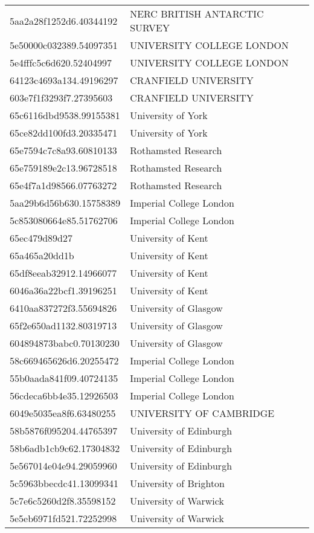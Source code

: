 \begin{tabular}{ll}
5aa2a28f1252d6.40344192 & NERC BRITISH ANTARCTIC SURVEY \\
5e50000c032389.54097351 & UNIVERSITY COLLEGE LONDON \\
5e4fffc5c6d620.52404997 & UNIVERSITY COLLEGE LONDON \\
64123c4693a134.49196297 & CRANFIELD UNIVERSITY \\
603e7f1f3293f7.27395603 & CRANFIELD UNIVERSITY \\
65c6116dbd9538.99155381 & University of York \\
65ce82dd100fd3.20335471 & University of York \\
65e7594c7c8a93.60810133 & Rothamsted Research \\
65e759189e2c13.96728518 & Rothamsted Research \\
65e4f7a1d98566.07763272 & Rothamsted Research \\
5aa29b6d56b630.15758389 & Imperial College London \\
5c853080664e85.51762706 & Imperial College London \\
65ec479d89d27 & University of Kent \\
65a465a20dd1b & University of Kent \\
65df8eeab32912.14966077 & University of Kent \\
6046a36a22bcf1.39196251 & University of Kent \\
6410aa837272f3.55694826 & University of Glasgow \\
65f2e650ad1132.80319713 & University of Glasgow \\
604894873babc0.70130230 & University of Glasgow \\
58c669465626d6.20255472 & Imperial College London \\
55b0aada841f09.40724135 & Imperial College London \\
56cdeca6bb4e35.12926503 & Imperial College London \\
6049e5035ea8f6.63480255 & UNIVERSITY OF CAMBRIDGE \\
58b5876f095204.44765397 & University of Edinburgh \\
58b6adb1cb9c62.17304832 & University of Edinburgh \\
5e567014e04e94.29059960 & University of Edinburgh \\
5c5963bbecdc41.13099341 & University of Brighton \\
5c7e6c5260d2f8.35598152 & University of Warwick \\
5e5eb6971fd521.72252998 & University of Warwick \\

\end{tabular}

